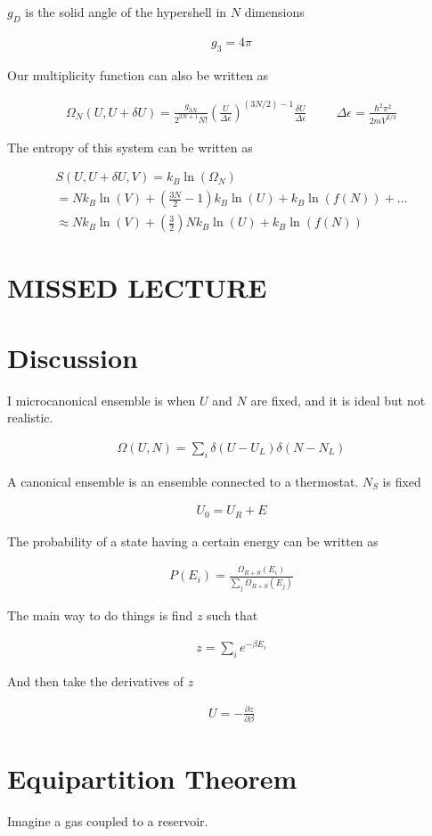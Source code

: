 \documentclass[fleqn]{report}
\newcommand{\hp}{\hspace{1cm}}
\newcommand{\del}{\partial}
\newcommand{\equations} [1] {
\begin{gather*}
#1
\end{gather*}
}
\begin{document}
$g_D$ is the solid angle of the hypershell in $N$ dimensions 

\equations{
    g_3 
    =
    4 \pi
}

Our multiplicity function can also be written as 

\equations{
    \Omega_N(U, U + \delta U)
    =
    \frac{g_{3N}}{2^{3N + 1} N!}
    \left(
        \frac{U}{\Delta \epsilon}
    \right)^{(3N/2) - 1}
    \frac{\delta U}{\Delta \epsilon}
    \hp 
    \Delta \epsilon 
    =
    \frac{\hbar^2 \pi^2}{2m V^{2/3}}
}

The entropy of this system can be written as 
\equations{
    S(U, U + \delta U, V)
    =
    k_B \ln(\Omega_N)
    \\
    =
    Nk_B \ln(V)
    +
    \left(
        \frac{3N}{2}
        -
        1
    \right) k_B \ln(U)
    +
    k_B \ln(f(N)) 
    +
    \ldots
    \\
    \approx
    Nk_B \ln(V)
    +
    \left(
        \frac{3}{2}
    \right) N k_B \ln(U)
    +
    k_B \ln(f(N)) 
}

\section{MISSED LECTURE}
\section{Discussion}
I microcanonical ensemble is when $U$ and $N$ are fixed, and it 
is ideal but not realistic.  

\equations{
    \Omega(U, N)
    =
    \sum_i 
    \delta(U - U_L)
    \delta(N - N_L)
}

A canonical ensemble is an ensemble connected to a thermostat. $N_S$ 
is fixed
\equations{
    U_0 = U_R + E 
}

The probability of a state having a certain energy can be written as 
\equations{
    P(E_i)
    =
    \frac{\Omega_{R + S}(E_i)}{\sum_j \Omega_{R+S}(E_j)}
}

The main way to do things is find $z$ such that 
\equations{
    z 
    =
    \sum_i e^{- \beta E_i}
}

And then take the derivatives of $z$ 
\equations{
    U 
    =
    -\frac{\del z}{\del \beta}
}

\section{Equipartition Theorem}
Imagine a gas coupled to a reservoir. 
\end{document}
